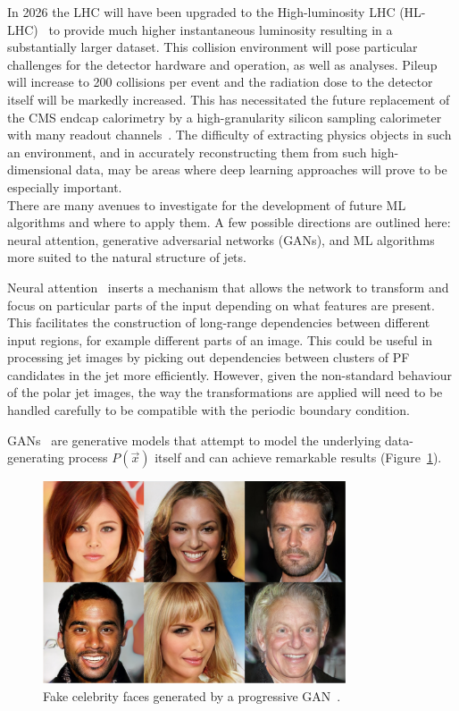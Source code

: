In 2026 the LHC will have been upgraded to the High-luminosity LHC (HL-LHC)~\cite{HLLHC} to provide much higher instantaneous luminosity resulting in a substantially larger dataset. 
This collision environment will pose particular challenges for the detector hardware and operation, as well as analyses.  
Pileup will increase to 200 collisions per event and the radiation dose to the detector itself will be markedly increased. This has necessitated the future replacement of the CMS endcap calorimetry by a high-granularity silicon sampling calorimeter with many readout channels~\cite{HGC}. 
The difficulty of extracting physics objects in such an environment, and in accurately reconstructing them from such high-dimensional data, may be areas where deep learning approaches will prove to be especially important. \\


There are many avenues to investigate for the development of future ML algorithms and where to apply them. 
A few possible directions are outlined here: neural attention, generative adversarial networks (GANs), and ML algorithms more suited to the natural structure of jets.

Neural attention~\cite{Attention,SpatialTransformer} inserts a mechanism that allows the network to transform and focus on particular parts of the input depending on what features are present. 
This facilitates the construction of long-range dependencies between different input regions, for example different parts of an image.
This could be useful in processing jet images by picking out dependencies between clusters of PF candidates in the jet more efficiently.
However, given the non-standard behaviour of the polar jet images, the way the transformations are applied will need to be handled carefully to be compatible with the periodic boundary condition.

GANs~\cite{GANs} are generative models that attempt to model the underlying data-generating process $P(\vec{x})$ itself and can achieve remarkable results (Figure~\ref{fig:conclusion:progan}).
\begin{figure}[h!]
    \begin{center}
        \includegraphics[width=0.8\textwidth]{figures/conclusion/progan.png}
    \end{center}
    \caption{Fake celebrity faces generated by a progressive GAN~\cite{ProGAN}.}
        \label{fig:conclusion:progan}
\end{figure}

